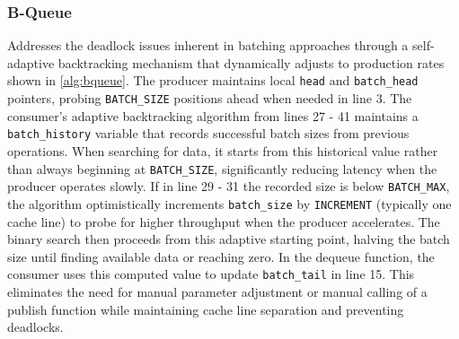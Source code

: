 \subsubsection{B-Queue}
Addresses the deadlock issues inherent in batching approaches through a self-adaptive backtracking mechanism that dynamically adjusts to production rates shown in \cref{alg:bqueue}. The producer maintains local \texttt{head} and \texttt{batch\_head} pointers, probing \texttt{BATCH\_SIZE} positions ahead when needed in line 3. The consumer's adaptive backtracking algorithm from lines 27 - 41 maintains a \texttt{batch\_history} variable that records successful batch sizes from previous operations. When searching for data, it starts from this historical value rather than always beginning at \texttt{BATCH\_SIZE}, significantly reducing latency when the producer operates slowly. If in line 29 - 31 the recorded size is below \texttt{BATCH\_MAX}, the algorithm optimistically increments \texttt{batch\_size} by \texttt{INCREMENT} (typically one cache line) to probe for higher throughput when the producer accelerates. The binary search then proceeds from this adaptive starting point, halving the batch size until finding available data or reaching zero. In the dequeue function, the consumer uses this computed value to update \texttt{batch\_tail} in line 15. This eliminates the need for manual parameter adjustment or manual calling of a publish function while maintaining cache line separation and preventing deadlocks. \cite{Wang2013BQueue}

